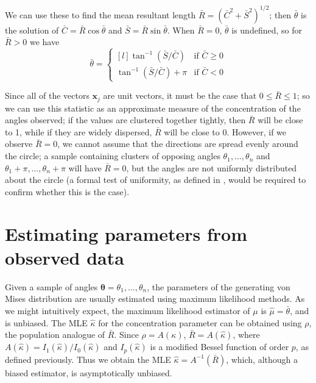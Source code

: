 \documentclass[12pt,fleqn]{article}
\begin{document}
We can use these to find the mean resultant length $\bar{R} = (\bar{C}^2 + \bar{S}^2)^{1/2}$; then $\bar{\theta}$ is the solution of $\bar{C} = \bar{R} \cos \bar{\theta}$ and $\bar{S} = \bar{R} \sin \bar{\theta}$. 
When $\bar{R} = 0$, $\bar{\theta}$ is undefined, so for $\bar{R} > 0$ we have 
\[ \bar{\theta} = \left\{ \begin{matrix*}[l]
\tan^{-1}(\bar{S}/\bar{C}) & \text{if }\bar{C} \geq 0 \\
\tan^{-1}(\bar{S}/\bar{C}) + \pi & \text{if }\bar{C} < 0 
\end{matrix*} \right. \]



Since all of the vectors $\mathbf{x}_j$ are unit vectors, it must be the case that $0 \leq \bar{R} \leq 1$; so we can use this statistic as an approximate measure of the concentration of the angles observed; if the values are clustered together tightly, then $\bar{R}$ will be close to 1, while if they are widely dispersed, $\bar{R}$ will be close to 0. However, if we observe $\bar{R} = 0$, we cannot assume that the directions are spread evenly around the circle; a sample containing clusters of opposing angles $\theta_1, \dots, \theta_n$ and $\theta_1+\pi, \dots, \theta_n+\pi$ will have $\bar{R} = 0$, but the angles are not uniformly distributed about the circle (a formal test of uniformity, as defined in \cite{Mardia1999}, would be required to confirm whether this is the case). %


\section{Estimating parameters from observed data}

Given a sample of angles $\boldsymbol{\theta} = \theta_1, \dots, \theta_n$,  the parameters of the generating von Mises distribution are usually estimated using maximum likelihood methods. As we might intuitively expect, the maximum likelihood estimator of $\mu$ is $\hat{\mu} = \bar{\theta}$, and is unbiased. The MLE $\hat{\kappa}$ for the concentration parameter can be obtained using $\rho$, the population analogue of $\bar{R}$. Since $\rho = A(\kappa)$, $\bar{R} = A(\hat{\kappa})$, where $A(\hat{\kappa}) = I_1(\hat{\kappa})/I_0(\hat{\kappa})$ and $I_p(\hat{\kappa})$ is a modified Bessel function of order $p$, as defined previously. Thus we obtain the MLE $\hat{\kappa} = A^{-1}(\bar{R})$, which, although a biased estimator, is asymptotically unbiased. 
\end{document}
